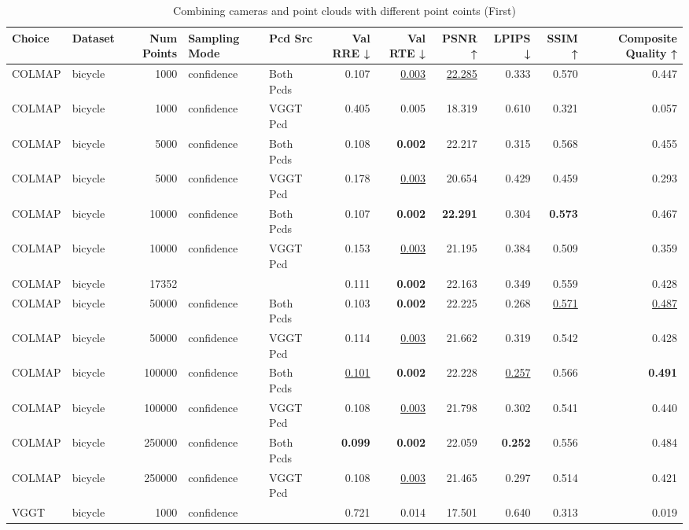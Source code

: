 \begin{table}[H]
\caption{Combining cameras and point clouds with different point coints (First)}
\label{tab:07_combined_num_points_first}
\centering
\scriptsize
\begin{tabular}{llrllrrrrrr}
\toprule
Choice & Dataset & Num Points & Sampling Mode & Pcd Src & Val RRE ↓ & Val RTE ↓ & PSNR ↑ & LPIPS ↓ & SSIM ↑ & Composite Quality ↑ \\
\midrule
COLMAP & bicycle & 1000 & confidence & Both Pcds & 0.107 & \underline{0.003} & \underline{22.285} & 0.333 & 0.570 & 0.447 \\
COLMAP & bicycle & 1000 & confidence & VGGT Pcd & 0.405 & 0.005 & 18.319 & 0.610 & 0.321 & 0.057 \\
COLMAP & bicycle & 5000 & confidence & Both Pcds & 0.108 & \textbf{0.002} & 22.217 & 0.315 & 0.568 & 0.455 \\
COLMAP & bicycle & 5000 & confidence & VGGT Pcd & 0.178 & \underline{0.003} & 20.654 & 0.429 & 0.459 & 0.293 \\
COLMAP & bicycle & 10000 & confidence & Both Pcds & 0.107 & \textbf{0.002} & \textbf{22.291} & 0.304 & \textbf{0.573} & 0.467 \\
COLMAP & bicycle & 10000 & confidence & VGGT Pcd & 0.153 & \underline{0.003} & 21.195 & 0.384 & 0.509 & 0.359 \\
COLMAP & bicycle & 17352 &  &  & 0.111 & \textbf{0.002} & 22.163 & 0.349 & 0.559 & 0.428 \\
COLMAP & bicycle & 50000 & confidence & Both Pcds & 0.103 & \textbf{0.002} & 22.225 & 0.268 & \underline{0.571} & \underline{0.487} \\
COLMAP & bicycle & 50000 & confidence & VGGT Pcd & 0.114 & \underline{0.003} & 21.662 & 0.319 & 0.542 & 0.428 \\
COLMAP & bicycle & 100000 & confidence & Both Pcds & \underline{0.101} & \textbf{0.002} & 22.228 & \underline{0.257} & 0.566 & \textbf{0.491} \\
COLMAP & bicycle & 100000 & confidence & VGGT Pcd & 0.108 & \underline{0.003} & 21.798 & 0.302 & 0.541 & 0.440 \\
COLMAP & bicycle & 250000 & confidence & Both Pcds & \textbf{0.099} & \textbf{0.002} & 22.059 & \textbf{0.252} & 0.556 & 0.484 \\
COLMAP & bicycle & 250000 & confidence & VGGT Pcd & 0.108 & \underline{0.003} & 21.465 & 0.297 & 0.514 & 0.421 \\
VGGT & bicycle & 1000 & confidence &  & 0.721 & 0.014 & 17.501 & 0.640 & 0.313 & 0.019 \\

\end{tabular}
\end{table}
